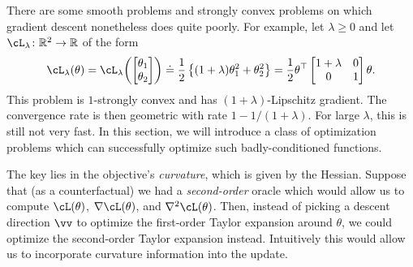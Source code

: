 \documentclass[../../book-main.tex]{subfiles}
\begin{document}
There are some smooth problems and strongly convex problems on which gradient descent nonetheless does quite poorly. For example, let \(\lambda \geq 0\) and let \(\cL_{\lambda} \colon \R^{2} \to \R\) of the form 
\begin{equation}
    \cL_{\lambda}(\theta) = \cL_{\lambda}\rp{\mat{\theta_{1} \\ \theta_{2}}} \doteq \frac{1}{2}\bc{(1 + \lambda) \theta_{1}^{2} + \theta_{2}^{2}} = \frac{1}{2}\theta^{\top}\mat{1 + \lambda & 0 \\ 0 & 1}\theta.
\end{equation}
This problem is \(1\)-strongly convex and has \((1 + \lambda)\)-Lipschitz gradient. The convergence rate is then geometric with rate \(1 - 1/(1 + \lambda)\). For large \(\lambda\), this is still not very fast. In this section, we will introduce a class of optimization problems which can successfully optimize such badly-conditioned functions.

The key lies in the objective's \textit{curvature}, which is given by the Hessian. Suppose that (as a counterfactual) we had a \textit{second-order} oracle which would allow us to compute \(\cL(\theta)\), \(\nabla \cL(\theta)\), and \(\nabla^{2}\cL(\theta)\). Then, instead of picking a descent direction \(\vv\) to optimize the first-order Taylor expansion around \(\theta\), we could optimize the second-order Taylor expansion instead. Intuitively this would allow us to incorporate curvature information into the update.
\end{document}

